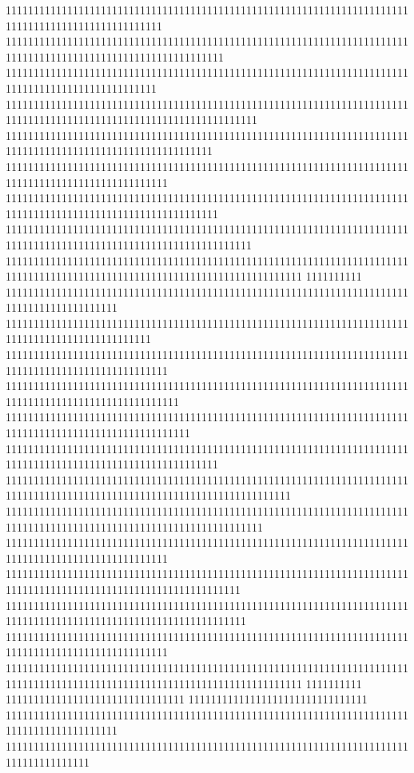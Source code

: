 1111111111111111111111111111111111111111111111111111111111111111111111111111111111111111111111111111
111111111111111111111111111111111111111111111111111111111111111111111111111111111111111111111111111111111111111
111111111111111111111111111111111111111111111111111111111111111111111111111111111111111111111111111
111111111111111111111111111111111111111111111111111111111111111111111111111111111111111111111111111111111111111111111
1111111111111111111111111111111111111111111111111111111111111111111111111111111111111111111111111111111111111
11111111111111111111111111111111111111111111111111111111111111111111111111111111111111111111111111111
11111111111111111111111111111111111111111111111111111111111111111111111111111111111111111111111111111111111111
11111111111111111111111111111111111111111111111111111111111111111111111111111111111111111111111111111111111111111111
11111111111111111111111111111111111111111111111111111111111111111111111111111111111111111111111111111111111111111111111111111
1111111111
11111111111111111111111111111111111111111111111111111111111111111111111111111111111111111111
11111111111111111111111111111111111111111111111111111111111111111111111111111111111111111111111111
11111111111111111111111111111111111111111111111111111111111111111111111111111111111111111111111111111
1111111111111111111111111111111111111111111111111111111111111111111111111111111111111111111111111111111
111111111111111111111111111111111111111111111111111111111111111111111111111111111111111111111111111111111
11111111111111111111111111111111111111111111111111111111111111111111111111111111111111111111111111111111111111
111111111111111111111111111111111111111111111111111111111111111111111111111111111111111111111111111111111111111111111111111
1111111111111111111111111111111111111111111111111111111111111111111111111111111111111111111111111111111111111111111111
11111111111111111111111111111111111111111111111111111111111111111111111111111111111111111111111111111
111111111111111111111111111111111111111111111111111111111111111111111111111111111111111111111111111111111111111111
1111111111111111111111111111111111111111111111111111111111111111111111111111111111111111111111111111111111111111111
11111111111111111111111111111111111111111111111111111111111111111111111111111111111111111111111111111
11111111111111111111111111111111111111111111111111111111111111111111111111111111111111111111111111111111111111111111111111111
1111111111
11111111111111111111111111111111
11111111111111111111111111111111
11111111111111111111111111111111111111111111111111111111111111111111111111111111111111111111
111111111111111111111111111111111111111111111111111111111111111111111111111111111111111
